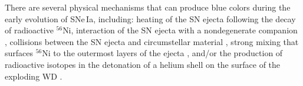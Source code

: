 \documentclass[twocolumn]{aastex631}
\begin{document}
\begin{CJK*}{UTF8}{gbsn}


There are several physical mechanisms that can produce blue colors during the early evolution of SNe\,Ia, including: heating of the SN ejecta following the decay of radioactive $^{56}$Ni, interaction of the SN ejecta with a nondegenerate companion \citep[e.g.,][]{Kasen_2010}, collisions between the SN ejecta and circumstellar material \citep[e.g.,][]{Piro_2016}, strong mixing that surfaces $^{56}$Ni to the outermost layers of the ejecta \citep[e.g.,][]{Piro_2013,Magee_2020}, and/or the production of radioactive isotopes in the detonation of a helium shell on the surface of the exploding WD \citep[e.g.,][]{Noebauer_2017,polin_observational_2019}.


\end{CJK*}
\end{document}
